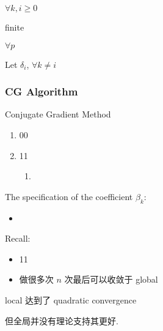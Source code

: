 \begin{lemma}
    $\forall k,i\ge 0$
\end{lemma}

\begin{corollary}
    finite
\end{corollary}

\begin{corollary}
    $\forall p$
\end{corollary}

\begin{lemma}
    Let $\delta_i$,  $\forall k\ne i$
\end{lemma}

\subsubsection{CG Algorithm}




Conjugate Gradient Method
\begin{enumerate}
    \item 00
    \item 11
    \begin{enumerate}
        \item 
    \end{enumerate}
\end{enumerate}

The specification of the coefficient $\beta_k$:
\begin{itemize}
    \item 
\end{itemize}

Recall: 
\begin{itemize}
    \item 11
    \item 做很多次 $n$ 次最后可以收敛于 global
\end{itemize}
local 达到了 quadratic convergence

但全局并没有理论支持其更好. 
